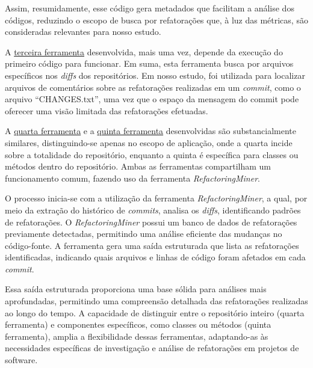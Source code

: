Assim, resumidamente, esse código gera metadados que facilitam a análise dos códigos, reduzindo o escopo de busca por refatorações que, à luz das métricas, são consideradas relevantes para nosso estudo.

A \href{https://github.com/BrenoFariasdaSilva/Scientific-Research/blob/main/PyDriller/Scripts/track_files.py}{terceira ferramenta} desenvolvida, mais uma vez, depende da execução do primeiro código para funcionar. Em suma, esta ferramenta busca por arquivos específicos nos \textit{diffs} dos repositórios. Em nosso estudo, foi utilizada para localizar arquivos de comentários sobre as refatorações realizadas em um \textit{commit}, como o arquivo ``CHANGES.txt'', uma vez que o espaço da mensagem do commit pode oferecer uma visão limitada das refatorações efetuadas.

A \href{https://github.com/BrenoFariasdaSilva/Scientific-Research/blob/main/PyDriller/Scripts/track_files.py}{quarta ferramenta} e a \href{https://github.com/BrenoFariasdaSilva/Scientific-Research/blob/main/RefactoringMiner/metrics_evolution_refactors.py}{quinta ferramenta} desenvolvidas são substancialmente similares, distinguindo-se apenas no escopo de aplicação, onde a quarta  incide sobre a totalidade do repositório, enquanto a quinta é específica para classes ou métodos dentro do repositório. Ambas as ferramentas compartilham um funcionamento comum, fazendo uso da ferramenta \textit{RefactoringMiner}.

O processo inicia-se com a utilização da ferramenta \textit{RefactoringMiner}, a qual, por meio da extração do histórico de \textit{commits}, analisa os \textit{diffs}, identificando padrões de refatorações. O \textit{RefactoringMiner} possui um banco de dados de refatorações previamente detectadas, permitindo uma análise eficiente das mudanças no código-fonte. A ferramenta gera uma saída estruturada que lista as refatorações identificadas, indicando quais arquivos e linhas de código foram afetados em cada \textit{commit}.

Essa saída estruturada proporciona uma base sólida para análises mais aprofundadas, permitindo uma compreensão detalhada das refatorações realizadas ao longo do tempo. A capacidade de distinguir entre o repositório inteiro (quarta ferramenta) e componentes específicos, como classes ou métodos (quinta ferramenta), amplia a flexibilidade dessas ferramentas, adaptando-as às necessidades específicas de investigação e análise de refatorações em projetos de software.

